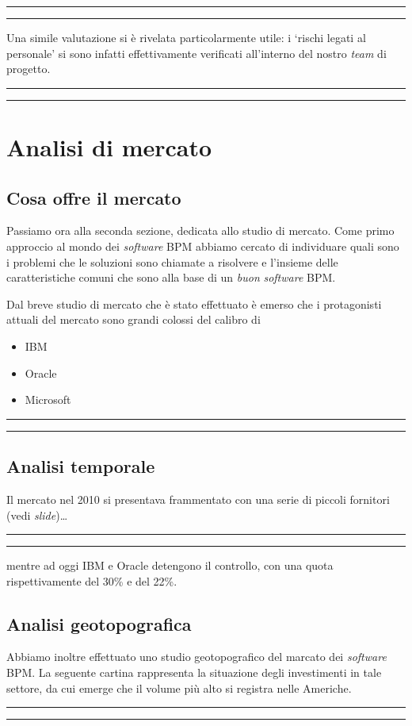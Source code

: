 \documentclass[a4paper,10pt]{article}
\newcommand{\inglese}[1]{\foreignlanguage{english}{\textit{#1}}}
\newcommand{\sw}{\inglese{software}\xspace}
\newcommand{\cambioslide}{%
\begin{center}
\Large
\rule[4pt]{0.2\linewidth}{.7pt} \ding{167} \rule[4pt]{0.2\linewidth}{.7pt}
\end{center}
}
\newcommand{\die}{%
\begin{center}
\fbox{$\mathcal{DIEGO}$}
\end{center}
}
\begin{document}
\cambioslide

Una simile valutazione si è rivelata particolarmente utile: i `rischi legati al personale' si sono infatti effettivamente verificati all'interno del nostro \inglese{team} di progetto.

\cambioslide

\clearpage
\die

\section{Analisi di mercato}

\subsection{Cosa offre il mercato}
Passiamo ora alla seconda sezione, dedicata allo studio di mercato. Come primo approccio al mondo dei \sw BPM abbiamo cercato di individuare quali sono i problemi che le soluzioni sono chiamate a risolvere e l'insieme delle caratteristiche comuni che sono alla base di un \emph{buon} \sw BPM.

Dal breve studio di mercato che è stato effettuato è emerso che i protagonisti attuali del mercato sono grandi colossi del calibro di
\begin{itemize}
  \item IBM
  \item Oracle
  \item Microsoft
\end{itemize}

\cambioslide

\subsection{Analisi temporale}
Il mercato nel 2010 si presentava frammentato con una serie di piccoli fornitori (vedi \inglese{slide})\ldots
\cambioslide
mentre ad oggi IBM e Oracle detengono il controllo, con una quota rispettivamente del 30\% e del 22\%.

\subsection{Analisi geotopografica}
Abbiamo inoltre effettuato uno studio geotopografico del marcato dei \sw BPM\@. La seguente cartina rappresenta la situazione degli investimenti in tale settore, da cui emerge che il volume più alto si registra nelle Americhe.

\cambioslide
\end{document}
